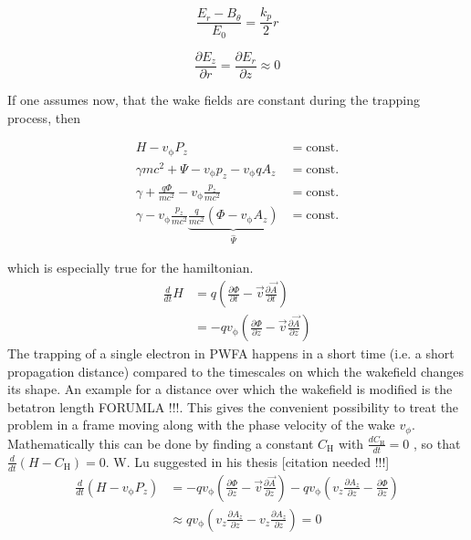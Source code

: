 \documentclass{thesis}
\begin{document}
\begin{equation}
\frac{E_r-B_\theta}{E_0}=\frac{k_p}{2}r
\end{equation}

\begin{equation}
\frac{\partial E_z}{\partial r}=\frac{\partial E_r}{\partial z} \approx 0
\end{equation}









If one assumes now, that the wake fields are constant during the trapping process, then 

\begin{align}
H-v_\mathrm{\phi}P_z &= \mathrm{const.}\\
\gamma m c^2+\Psi-v_\mathrm{\phi}p_z-v_\mathrm{\phi}qA_z &= \mathrm{const.}\\
\gamma+\frac{q \Phi}{m c^2}-v_\mathrm{\phi} \frac{p_z}{mc^2} &= \mathrm{const.}\\
\gamma - v_\mathrm{\phi} \frac{p_z}{mc^2} \underbrace{\frac{q}{mc^2}(\Phi-v_\mathrm{\phi}A_z)}_{\hat{\Psi}}  &= \mathrm{const.} 
\end{align}

which is especially true for the hamiltonian.
\begin{align*}
\frac{d}{dt}H&=q(\frac{\partial \Phi}{\partial t}-\vec{v}\frac{\partial \vec{A}}{\partial t})\\
&=-q v_\mathrm{\phi}(\frac{\partial \Phi}{\partial z}-\vec{v} \frac{\partial \vec{A}}{\partial z})
\end{align*}
The trapping of a single electron in PWFA happens in a short time (i.e. a short propagation distance) compared to the timescales on which the wakefield changes its shape. An example for a distance over which the wakefield is modified is the betatron length FORUMLA !!!.
This gives the convenient possibility to treat the problem in a frame moving along with the phase velocity of the wake $v_\phi$. Mathematically this can be done by finding a constant $C_\mathrm{H}$ with $\frac{d C_\mathrm{H}}{dt}=0$ , so that $\frac{d}{dt}(H-C_\mathrm{H})=0$.
W. Lu suggested in his thesis [citation needed !!!] 
\begin{align*}
\frac{d}{dt}(H-v_\mathrm{\phi} P_z)&=-qv_\mathrm{\phi}(\frac{\partial \Phi}{\partial z}-\vec{v}\frac{\partial \vec{A}}{\partial z})-qv_\mathrm{\phi}(v_z \frac{\partial A_z}{\partial z}-\frac{\partial \Phi}{\partial z})\\
&\approx q v_\mathrm{\phi}(v_z \frac{\partial A_z}{\partial z}-v_z \frac{\partial A_z}{\partial z})=0
\end{align*}
\end{document}
